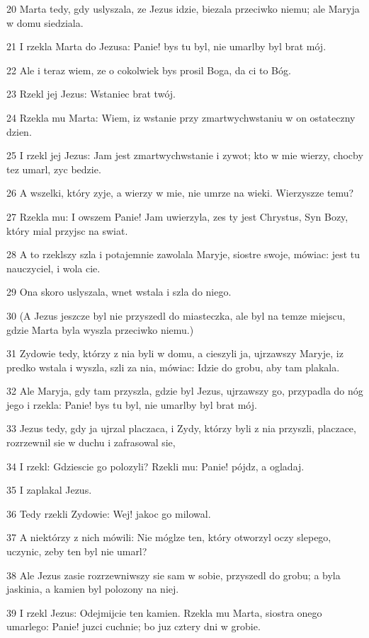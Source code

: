 \par 20 Marta tedy, gdy uslyszala, ze Jezus idzie, biezala przeciwko niemu; ale Maryja w domu siedziala.
\par 21 I rzekla Marta do Jezusa: Panie! bys tu byl, nie umarlby byl brat mój.
\par 22 Ale i teraz wiem, ze o cokolwiek bys prosil Boga, da ci to Bóg.
\par 23 Rzekl jej Jezus: Wstaniec brat twój.
\par 24 Rzekla mu Marta: Wiem, iz wstanie przy zmartwychwstaniu w on ostateczny dzien.
\par 25 I rzekl jej Jezus: Jam jest zmartwychwstanie i zywot; kto w mie wierzy, chocby tez umarl, zyc bedzie.
\par 26 A wszelki, który zyje, a wierzy w mie, nie umrze na wieki. Wierzyszze temu?
\par 27 Rzekla mu: I owszem Panie! Jam uwierzyla, zes ty jest Chrystus, Syn Bozy, który mial przyjsc na swiat.
\par 28 A to rzeklszy szla i potajemnie zawolala Maryje, siostre swoje, mówiac: jest tu nauczyciel, i wola cie.
\par 29 Ona skoro uslyszala, wnet wstala i szla do niego.
\par 30 (A Jezus jeszcze byl nie przyszedl do miasteczka, ale byl na temze miejscu, gdzie Marta byla wyszla przeciwko niemu.)
\par 31 Zydowie tedy, którzy z nia byli w domu, a cieszyli ja, ujrzawszy Maryje, iz predko wstala i wyszla, szli za nia, mówiac: Idzie do grobu, aby tam plakala.
\par 32 Ale Maryja, gdy tam przyszla, gdzie byl Jezus, ujrzawszy go, przypadla do nóg jego i rzekla: Panie! bys tu byl, nie umarlby byl brat mój.
\par 33 Jezus tedy, gdy ja ujrzal placzaca, i Zydy, którzy byli z nia przyszli, placzace, rozrzewnil sie w duchu i zafrasowal sie,
\par 34 I rzekl: Gdziescie go polozyli? Rzekli mu: Panie! pójdz, a ogladaj.
\par 35 I zaplakal Jezus.
\par 36 Tedy rzekli Zydowie: Wej! jakoc go milowal.
\par 37 A niektórzy z nich mówili: Nie móglze ten, który otworzyl oczy slepego, uczynic, zeby ten byl nie umarl?
\par 38 Ale Jezus zasie rozrzewniwszy sie sam w sobie, przyszedl do grobu; a byla jaskinia, a kamien byl polozony na niej.
\par 39 I rzekl Jezus: Odejmijcie ten kamien. Rzekla mu Marta, siostra onego umarlego: Panie! juzci cuchnie; bo juz cztery dni w grobie.
